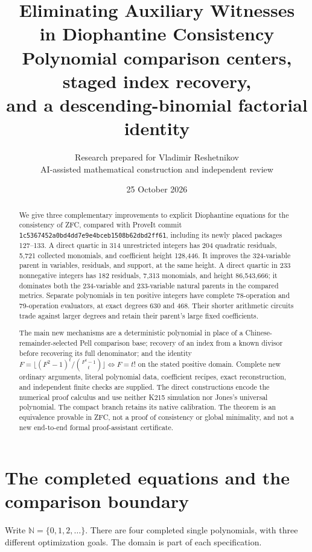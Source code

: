 \documentclass[11pt,a4paper]{article}
\title{\color{ink}\textbf{Eliminating Auxiliary Witnesses\\in Diophantine Consistency}\\[7pt]
\large Polynomial comparison centers, staged index recovery,\\and a descending-binomial factorial identity}
\author{Research prepared for Vladimir Reshetnikov\\
\small AI-assisted mathematical construction and independent review}
\date{25 October 2026}
\theoremstyle{remark}\newtheorem{remark}[theorem]{Remark}
\newcommand{\N}{\mathbb N}
\newcommand{\code}[1]{\nolinkurl{#1}}
\begin{document}
\maketitle\thispagestyle{empty}
\begin{abstract}
We give three complementary improvements to explicit Diophantine equations
for the consistency of ZFC, compared with ProveIt commit
\code{1c5367452a0bd4dd7e9e4bceb1508b62dbd2ff61}, including its newly placed
packages 127--133. A direct quartic in 314 unrestricted integers has 204
quadratic residuals, 5,721 collected monomials, and coefficient height
128,446. It improves the 324-variable parent in variables, residuals, and
support, at the same height. A direct quartic in 233 nonnegative integers
has 182 residuals, 7,313 monomials, and height 86,543,666; it dominates
both the 234-variable and 233-variable natural parents in the compared
metrics. Separate polynomials in ten positive integers have complete
78-operation and 79-operation evaluators, at exact degrees 630 and 468.
Their shorter arithmetic circuits trade against larger degrees and retain
their parent's large fixed coefficients.

The main new mechanisms are a deterministic polynomial in place of a
Chinese-remainder-selected Pell comparison base; recovery of an index
from a known divisor before recovering its full denominator; and the
identity
\(F=\lfloor(F^2-1)^t/\binom{F^2-1}{t}\rfloor\iff F=t!\)
on the stated positive domain. Complete new ordinary arguments,
literal polynomial data, coefficient recipes, exact reconstruction,
and independent finite checks are supplied. The direct constructions
encode the numerical proof calculus and use neither K215 simulation nor
Jones's universal polynomial. The compact branch retains its native
calibration. The theorem is an equivalence provable in ZFC, not a proof
of consistency or global minimality, and not a new end-to-end formal
proof-assistant certificate.
\end{abstract}
\newpage
{\setlength{\parskip}{0pt}\tableofcontents}
\newpage

\section{The completed equations and the comparison boundary}
\label{sec:results}

Write \(\N=\{0,1,2,\ldots\}\). There are four completed single
polynomials, with three different optimization goals. The domain is part
of each specification.
\end{document}
